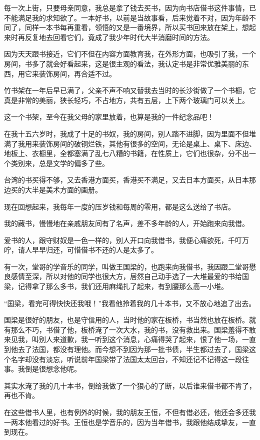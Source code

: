 \par 每一次上街，只要母亲同意，我总是拿了钱去买书，因为向书店借书这件事情，已不能满足我的求知欲了。一本好书，以前是当故事看，后来觉着不对，因为年龄不同了，同样一本书每再重看，领悟的又是一番境界，所以买书回来放在架上，想起来时再反复地去回看它们，竟成了我少年时代大半消磨时间的方法。
\par 因为天天跟书接近，它们不但在内容方面教育我，在外形方面，也吸引了我，一个房间，书多了就会好看起来，这是很主观的看法，我认定书是非常优雅美丽的东西，用它来装饰房间，再合适不过。
\par 竹书架在一年后早已满了，父亲不声不响又替我去当时的长沙街做了一个书橱，它真是非常的美丽，狭长轻巧，不占地方，共有五层，上下两个玻璃门可以关上。
\par 这一个书架，至今在我父母的家里放着，也算是我的一件纪念品吧！
\par 在我十五六岁时，我成了十足的书奴，我的房间，别人踏不进脚，因为里面不但堆满了我用来装饰房间的破铜烂铁，其他有很多的空间，无论是桌上、桌下、床边、地板上、衣橱里，全都塞满了乱七八糟的书籍，在性质上，它们也很杂，分不出一个类别来，总是文学的偏多了些。
\par 台湾的书买得不够，又去香港方面买，香港买不满足，又去日本方面买，从日本那边买的大半是美术方面的画册。
\par 现在回想起来，我每年一度的压岁钱和每周的零用，都是这么送给了书店。
\par 我的藏书，慢慢地在亲戚朋友间有了名声，差不多年龄的人，开始跑来向我借。
\par 爱书的人，跟守财奴是一色一样的，别人开口向我借书，我便心痛欲死，千叮万咛，请人早早归还，可惜借书不还的人是太多了。
\par 有一次，堂哥的学音乐的同学，叫做王国梁的，也跑来向我借书，我因跟二堂哥懋良感情至深，所以对他的同学也很大方，居然自己动手选了一大堆最爱的书给国梁，记得拿了那么多书，我们还用麻绳扎了起来，有到腰那么高一小堆。
\par “国梁，看完可得快快还我哦！”我看他拎着我的几十本书，又不放心地追了出去。
\par 国梁是很好的朋友，也是守信用的人，当时他的家在板桥，书当然也放在板桥。就有那么不巧，书借了他，板桥淹了一次大水，我的书，没有救出来。国梁羞得不敢来见我，叫别人来道歉，我一听到这个消息，心痛得哭了起来，恨了他一场，一直到他去了法国，都没有理他。而今想不到因为那一批书债，半生都过去了，国梁这个名字却没有淡忘，听说前年国梁带了法国太太回台，不知还记不记得这一段往事。我倒是很想念他呢。
\par 其实水淹了我的几十本书，倒给我做了一个狠心的了断，以后谁来借书都不肯了，再也不肯。
\par 在这些借书人里，也有例外的时候，我的朋友王恒，不但有借必还，他还会多还我一两本他看过的好书。王恒也是学音乐的，因为当年借书，我跟他结成挚友，一直到现在。
